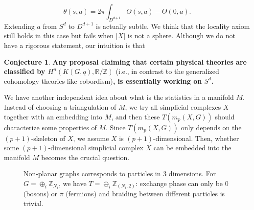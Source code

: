 \documentclass[reprint, amsmath, amssymb, showpacs, floatfix, longbibliography, aps, twocolumn, superscriptaddress, nofootinbib]{revtex4-2}
\newcommand{\ZZ}{{\mathbb Z}}
\newcommand{\RR}{{\mathbb R}}
\theoremstyle{definition}
\newtheorem{conjecture}{Conjecture}[section]
\begin{document}
\begin{equation}
	\theta(s,a)=2\pi\int_{D^{d+1}} \Theta(s,a)-\Theta(0,a).
\end{equation}
Extending $a$ from $S^d$ to $D^{d+1}$ is actually subtle. We think that the locality axiom still holds in this case but fails when $|X|$ is not a sphere. Although we do not have a rigorous statement, our intuition is that

\begin{conjecture}
	\textbf{	Any proposal claiming that certain physical theories are classified by $H^n(K(G,q),\RR/\ZZ)$ } (i.e., in contrast to the generalized cohomology theories like cobordism)\textbf{, is essentially working on $S^d$.}
\end{conjecture}

We have another independent idea about what is the statistics in a manifold $M$. Instead of choosing a triangulation of $M$, we try all simplicial complexes $X$ together with an embedding into $M$, and then these $T(m_p(X,G))$ should characterize some properties of $M$. Since $T(m_p(X,G))$ only depends on the $(p+1)$-skeleton of $X$, we assume $X$ is $(p+1)$-dimensional. Then, whether some $(p+1)$-dimensional simplicial complex $X$ can be embedded into the manifold $M$ becomes the crucial question. 

\begin{figure}
	\centering
	\caption{Non-planar graphs corresponds to particles in 3 dimensions. For $G=\oplus_i\ZZ_{N_i}$, we have $T=\oplus_i\ZZ_{(N_i,2)}$: exchange phase can only be $0$ (bosons) or $\pi$ (fermions) and braiding between different particles is trivial.}
	\label{figFermion}
\end{figure}
\end{document}
